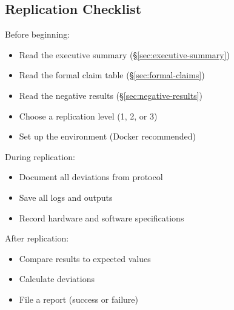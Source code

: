 \subsection{Replication Checklist}

Before beginning:
\begin{itemize}
  \item Read the executive summary (\S\ref{sec:executive-summary})
  \item Read the formal claim table (\S\ref{sec:formal-claims})
  \item Read the negative results (\S\ref{sec:negative-results})
  \item Choose a replication level (1, 2, or 3)
  \item Set up the environment (Docker recommended)
\end{itemize}

During replication:
\begin{itemize}
  \item Document all deviations from protocol
  \item Save all logs and outputs
  \item Record hardware and software specifications
\end{itemize}

After replication:
\begin{itemize}
  \item Compare results to expected values
  \item Calculate deviations
  \item File a report (success or failure)
\end{itemize}
